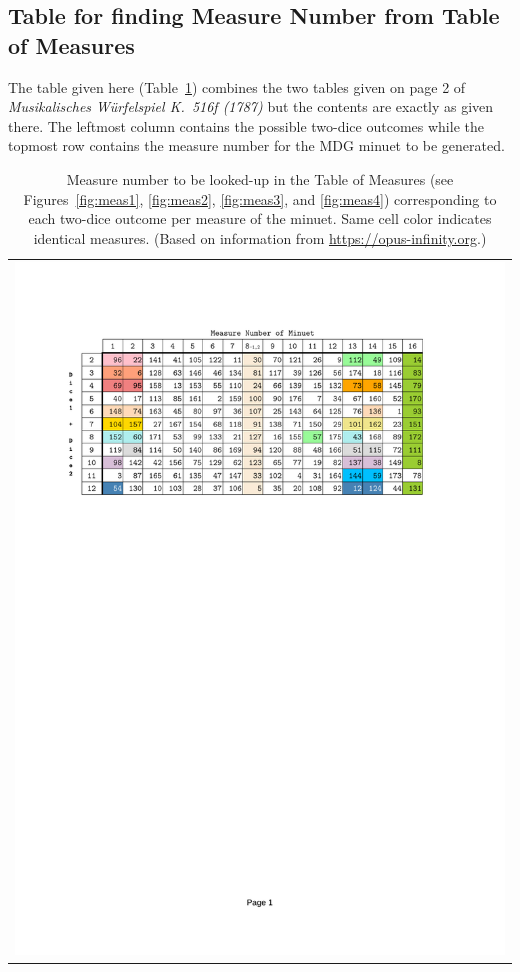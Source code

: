 \documentclass[letterpaper,x11names,svgnames,10pt]{article}
\begin{document}
\subsection{Table for finding Measure Number from Table of Measures}\label{tableFind}
The table given here (Table~\ref{fig:0tab1}) combines the two tables given on page 2 of {\it Musikalisches W\"{u}rfelspiel K.\ 516f (1787)} but the contents are exactly as given there.  The leftmost column contains the possible two-dice outcomes while the topmost row contains the measure number for the MDG minuet to be generated.

\begin{table}[H]
	\centering
	\begin{tabular}{c}
		\centering
		\includegraphics[clip=true,trim=0.90in 7.75in 1.25in 1.00in,scale=0.90]{12TAB}
	\end{tabular}
	\caption{Measure number to be looked-up in the Table of Measures (see Figures~\ref{fig:meas1}, \ref{fig:meas2}, \ref{fig:meas3}, and \ref{fig:meas4}) corresponding to each two-dice outcome per measure of the minuet. Same cell color indicates identical measures. (Based on information from \href{https://opus-infinity.org/dice_games/mozart_waltz/tables/}{https://opus-infinity.org}.)}
	\label{fig:0tab1}
\end{table}
\end{document}
